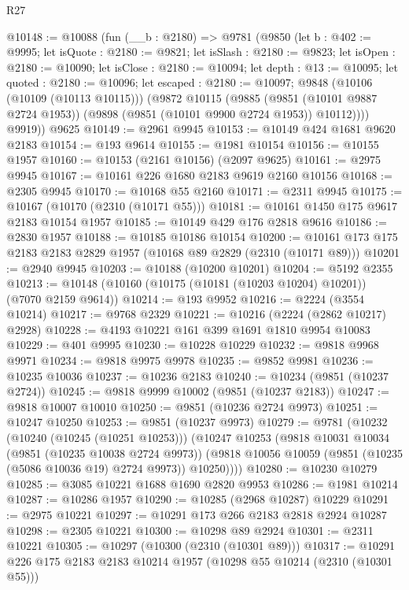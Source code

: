 \begin{lexlean}{R27}
\begin{coremodule}
@10148 := @10088
    (fun (__b : @2180) =>
    @9781
      (@9850
        (let b : @402 := @9995;
        let isQuote : @2180 := @9821;
        let isSlash : @2180 := @9823;
        let isOpen : @2180 := @10090;
        let isClose : @2180 := @10094;
        let depth : @13 := @10095;
        let quoted : @2180 := @10096;
        let escaped : @2180 := @10097;
        @9848
          (@10106 (@10109 (@10113 @10115)))
          (@9872
            @10115
            (@9885
              (@9851 (@10101 @9887 @2724 @1953))
              (@9898 (@9851 (@10101 @9900 @2724 @1953)) @10112))))
        @9919))
    @9625
@10149 := @2961 @9945
@10153 := @10149 @424 @1681 @9620 @2183
@10154 := @193 @9614
@10155 := @1981 @10154
@10156 := @10155 @1957
@10160 := @10153 (@2161 @10156) (@2097 @9625)
@10161 := @2975 @9945
@10167 := @10161 @226 @1680 @2183 @9619 @2160 @10156
@10168 := @2305 @9945
@10170 := @10168 @55 @2160
@10171 := @2311 @9945
@10175 := @10167 (@10170 (@2310 (@10171 @55)))
@10181 := @10161 @1450 @175 @9617 @2183 @10154 @1957
@10185 := @10149 @429 @176 @2818 @9616
@10186 := @2830 @1957
@10188 := @10185 @10186 @10154
@10200 := @10161 @173 @175 @2183 @2183 @2829 @1957 (@10168 @89 @2829 (@2310 (@10171 @89)))
@10201 := @2940 @9945
@10203 := @10188 (@10200 @10201)
@10204 := @5192 @2355
@10213 := @10148 (@10160 (@10175 (@10181 (@10203 @10204) @10201)) (@7070 @2159 @9614))
@10214 := @193 @9952
@10216 := @2224 (@3554 @10214)
@10217 := @9768 @2329
@10221 := @10216 (@2224 (@2862 @10217) @2928)
@10228 := @4193 @10221 @161 @399 @1691 @1810 @9954 @10083
@10229 := @401 @9995
@10230 := @10228 @10229
@10232 := @9818 @9968 @9971
@10234 := @9818 @9975 @9978
@10235 := @9852 @9981
@10236 := @10235 @10036
@10237 := @10236 @2183
@10240 := @10234 (@9851 (@10237 @2724))
@10245 := @9818 @9999 @10002 (@9851 (@10237 @2183))
@10247 := @9818 @10007 @10010
@10250 := @9851 (@10236 @2724 @9973)
@10251 := @10247 @10250
@10253 := @9851 (@10237 @9973)
@10279 := @9781
    (@10232
      (@10240 (@10245 (@10251 @10253)))
      (@10247
        @10253
        (@9818
          @10031
          @10034
          (@9851 (@10235 @10038 @2724 @9973))
          (@9818 @10056 @10059 (@9851 (@10235 (@5086 @10036 @19) @2724 @9973)) @10250))))
@10280 := @10230 @10279
@10285 := @3085 @10221 @1688 @1690 @2820 @9953
@10286 := @1981 @10214
@10287 := @10286 @1957
@10290 := @10285 (@2968 @10287) @10229
@10291 := @2975 @10221
@10297 := @10291 @173 @266 @2183 @2818 @2924 @10287
@10298 := @2305 @10221
@10300 := @10298 @89 @2924
@10301 := @2311 @10221
@10305 := @10297 (@10300 (@2310 (@10301 @89)))
@10317 := @10291 @226 @175 @2183 @2183 @10214 @1957 (@10298 @55 @10214 (@2310 (@10301 @55)))

\end{coremodule}
\end{lexlean}
